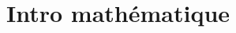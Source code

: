 \documentclass[../main.tex]{subfiles}
\begin{document}
\section{Intro mathématique}
\renewcommand{\arraystretch}{2} %
\end{document}
